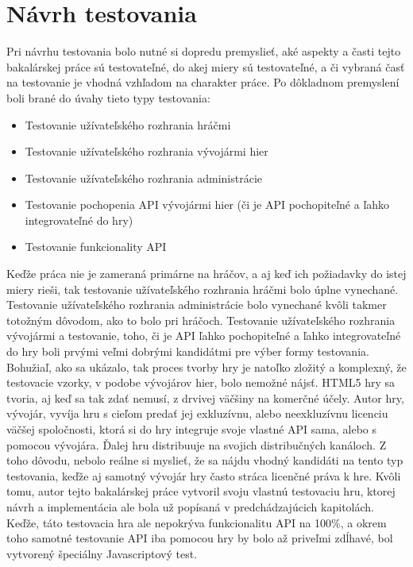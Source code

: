 \section{Návrh testovania}
Pri návrhu testovania bolo nutné si dopredu premyslieť, aké aspekty a časti tejto bakalárskej práce sú testovateľné, do akej miery sú testovateľné, a či vybraná časť na testovanie je vhodná vzhľadom na charakter práce. Po dôkladnom premyslení boli brané do úvahy tieto typy testovania:  
\begin{itemize}
\item Testovanie užívateľského rozhrania hráčmi
\item Testovanie užívateľského rozhrania vývojármi hier
\item Testovanie užívateľského rozhrania administrácie
\item Testovanie pochopenia API vývojármi hier (či je API pochopiteľné a ľahko integrovateľné do hry)
\item Testovanie funkcionality API
\end{itemize}
Keďže práca nie je zameraná primárne na hráčov, a aj keď ich požiadavky do istej miery rieši, tak testovanie užívateľského rozhrania hráčmi bolo úplne vynechané. Testovanie užívateľského rozhrania administrácie bolo vynechané kvôli takmer totožným dôvodom, ako to bolo pri hráčoch. Testovanie užívateľského rozhrania vývojármi a testovanie, toho, či je API ľahko pochopiteľné a ľahko integrovateľné do hry boli prvými veľmi dobrými kandidátmi pre výber formy testovania. Bohužiaľ, ako sa ukázalo, tak proces tvorby hry je natoľko zložitý a komplexný, že testovacie vzorky, v podobe vývojárov hier, bolo nemožné nájsť. HTML5 hry sa tvoria, aj keď sa tak zdať nemusí, z drvivej väčšiny na komerčné účely. Autor hry, vývojár, vyvíja hru s cieľom predať jej exkluzívnu, alebo neexkluzívnu licenciu väčšej spoločnosti, ktorá si do hry integruje svoje vlastné API sama, alebo s pomocou vývojára. Ďalej hru distribuuje na svojich distribučných kanáloch. Z toho dôvodu, nebolo reálne si myslieť, že sa nájdu vhodný kandidáti na tento typ testovania, keďže aj samotný vývojár hry často stráca licenčné práva k hre. Kvôli tomu, autor tejto bakalárskej práce vytvoril svoju vlastnú testovaciu hru, ktorej návrh a implementácia ale bola už popísaná v predchádzajúcich kapitolách.  Keďže, táto testovacia hra ale nepokrýva funkcionalitu API na 100\%, a okrem toho samotné testovanie API iba pomocou hry by bolo až priveľmi zdĺhavé, bol vytvorený špeciálny Javascriptový test. 

